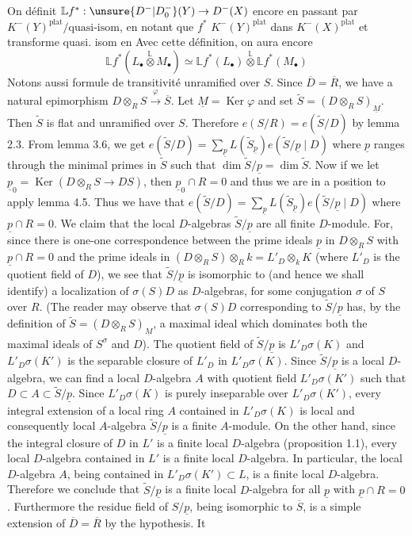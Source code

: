 On définit $\mathbb Lf^*:\unsure{D^-|D_0^-}(Y)\to D^-(X)$ encore en passant par $K^-(Y)^{\mathrm{plat}}/\text{quasi-isom}$, en notant que $f^*$    $K^-(Y)^{\mathrm{plat}}$ dans $K^-(X)^{\mathrm{plat}}$ et transforme quasi. isom en  Avec cette définition, on aura encore
\[
\mathbb Lf^*(L_\bullet\overset{\mathbb L}{\otimes}M_\bullet)\simeq\mathbb Lf^*(L_\bullet)\overset{\mathbb L}{\otimes}\mathbb Lf^*(M_\bullet)
\]
Notons aussi formule de transitivité
unramified over $S$. Since $\overline D=\overline R$, we have a natural epimorphism $D\otimes_R S\xrightarrow{\varphi}\overline S$. Let $\underline M=\operatorname{Ker}\varphi$ and set $\widetilde S=(D\otimes_R S)_{\underline M}$. Then $\widetilde S$ is flat and unramified over $S$. Therefore $e(S/R)=e(\widetilde S/D)$ by lemma 2.3. From lemma 3.6, we get $e(\widetilde S/D)=\sum_{\underline p}L(\widetilde S_{\underline p})e(\widetilde S/\underline p\mid D)$ where $\underline p$ ranges through the minimal primes in $\widetilde S$ such that $\dim\widetilde S/\underline p=\dim\widetilde S$. Now if we let $\underline p_0=\operatorname{Ker}(D\otimes_R S\longrightarrow DS)$, then $\underline p_0\cap R=0$ and thus we are in a position to apply lemma 4.5. Thus we have that $e(\widetilde S/D)=\sum_{\underline p}L(\widetilde S_{\underline p})e(\widetilde S/\underline p\mid D)$ where $\underline p\cap R=0$. We claim that the local $D$-algebras $\widetilde S/\underline p$ are all finite $D$-module. For, since there is one-one correspondence between the prime ideals $\underline p$ in $D\otimes_R S$ with $\underline p\cap R=0$ and the prime ideals in $(D\otimes_R S)\otimes_R k=L'_D\otimes_k K$ (where $L'_D$ is the quotient field of $D$), we see that $\widetilde S/\underline p$ is isomorphic to (and hence we shall identify) a localization of $\sigma(S)D$ as $D$-algebras, for some conjugation $\sigma$ of $S$ over $R$. (The reader may observe that $\sigma(S)D$ corresponding to $\widetilde S/\underline p$ has, by the definition of $\widetilde S=(D\otimes_R S)_{\underline M}$, a maximal ideal which dominates both the maximal ideals of $S^\sigma$ and $D$). The quotient field of $\widetilde S/\underline p$ is $L'_D\sigma(K)$ and $L'_D\sigma(K')$ is the separable closure of $L'_D$ in $L'_D\sigma(K)$. Since $\widetilde S/\underline p$ is a local $D$-algebra, we can find a local $D$-algebra $A$ with quotient field $L'_D\sigma(K')$ such that $D\subset A\subset\widetilde S/\underline p$. Since $L'_D\sigma(K)$ is purely inseparable over $L'_D\sigma(K')$, every integral extension of a local ring $A$ contained in $L'_D\sigma(K)$ is local and consequently local $A$-algebra $\widetilde S/\underline p$ is a finite $A$-module. On the other hand, since the integral closure of $D$ in $L'$ is a finite local $D$-algebra (proposition 1.1), every local $D$-algebra contained in $L'$ is a finite local $D$-algebra. In particular, the local $D$-algebra $A$, being contained in $L'_D\sigma(K')\subset L$, is a finite local $D$-algebra. Therefore we conclude that $\widetilde S/\underline p$ is a finite local $D$-algebra for all $\underline p$ with $\underline p\cap R=0$. Furthermore the residue field of $S/\underline p$, being isomorphic to $\overline S$, is a simple extension of $\overline D=\overline R$ by the hypothesis. It
